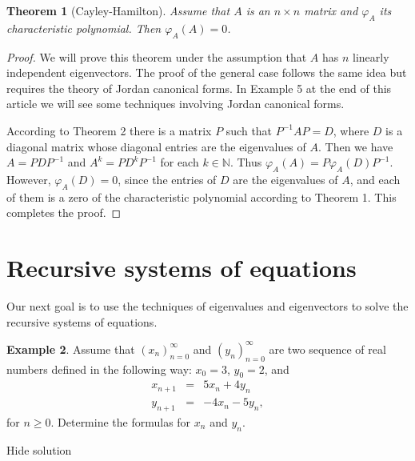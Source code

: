 \documentclass[11pt]{article}
\newtheorem{thm}{Theorem}[section]
\theoremstyle{definition}
\newtheorem{exmp}[thm]{Example}
\theoremstyle{plain}
\begin{document}
\begin{thm}[Cayley-Hamilton]
Assume that \( A \) is an \( n\times n \) matrix and \( \varphi_A \) its characteristic polynomial. Then \( \varphi_A(A)=0 \).
\end{thm}
\begin{proof}
We will prove this theorem under the assumption that \( A \) has \( n \) linearly independent eigenvectors. The proof of the general case follows the same idea but requires the theory of Jordan canonical forms. In Example 5 at the end of this article we will see some techniques involving Jordan canonical forms.

According to Theorem 2 there is a matrix \( P \) such that \( P^{-1}AP=D \), where \( D \) is a diagonal matrix whose diagonal entries are the eigenvalues of \( A \). Then we have \( A=PDP^{-1} \) and \( A^k=PD^kP^{-1} \) for each \( k\in\mathbb N \). Thus \( \varphi_A(A)=P\varphi_A(D)P^{-1} \). However, \( \varphi_A(D)=0 \), since the entries of \( D \) are the eigenvalues of \( A \), and each of them is a zero of the characteristic polynomial according to Theorem 1. This completes the proof.
\end{proof}

\section{Recursive systems of equations}

Our next goal is to use the techniques of eigenvalues and eigenvectors to solve the recursive systems of equations.

\begin{exmp}
Assume that \( (x_n)_{n=0}^{\infty} \) and \( (y_n)_{n=0}^{\infty} \) are two sequence of real numbers defined in the following way: \( x_0=3 \), \( y_0=2 \), and \begin{eqnarray*} x_{n+1}&=&5x_n+4y_n\\ y_{n+1}&=&-4x_n-5y_n, \end{eqnarray*} for \( n\geq 0 \). Determine the formulas for \( x_n \) and \( y_n \).
\end{exmp}

Hide solution
\end{document}
